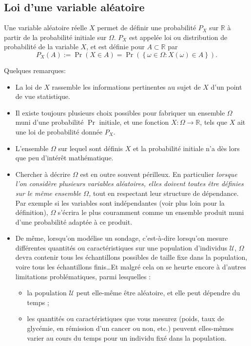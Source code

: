 \documentclass[12pt, a4paper]{book}
\numberwithin{equation}{section}
\newcommand{\R}{{\mathbb R}}
\begin{document}
\subsection{Loi d'une variable aléatoire}

Une variable aléatoire réelle $X$ permet de définir une probabilité $P_X$ sur $\R$ à partir de la probabilité initiale sur $\Omega$. $P_X$ est appelée loi ou distribution de probabilité de la variable $X$, et est définie pour $A\subset \R$ par
\[ P_X(A) := \Pr(X\in A) = \Pr\left(\left\{\omega\in\Omega: X(\omega)\in A\right\}\right). \]

Quelques remarques:
\begin{itemize}
  \item La loi de $X$ rassemble les informations pertinentes au sujet de $X$ d'un point de vue statistique.
	\item Il existe toujours plusieurs choix possibles pour fabriquer un ensemble $\Omega$ muni d'une probabilité $\Pr$ initiale, et une fonction $X: \Omega \rightarrow \R$, tels que $X$ ait une loi de probabilité donnée $P_X$.
	\item L'ensemble $\Omega$ sur lequel sont définis $X$ et la probabilité initiale n'a dès lors que peu d'intérêt mathématique.
	\item Chercher à décrire $\Omega$ est en outre souvent périlleux. En particulier \emph{lorsque l'on considère plusieurs variables aléatoires, elles doivent toutes être définies sur le même ensemble $\Omega$,} tout en respectant leur structure de dépendance. Par exemple si les variables sont indépendantes (voir plus loin pour la définition), $\Omega$ s'écrira le plus couramment comme un ensemble produit muni d'une probabilité adaptée à ce produit.
	\item De même, lorsqu'on modélise un sondage, c'est-à-dire lorsqu'on mesure différentes quantités ou caractéristiques sur une population d'individus $\mathcal{U}$, $\Omega$ devra contenir tous les échantillons possibles de taille fixe dans la population, voire tous les échantillons finis\dots Et malgré cela on se heurte encore à d'autres limitations problématiques, parmi lesquelles :
  \begin{itemize}
    \item la population $\mathcal{U}$ peut elle-même être aléatoire, et elle peut dépendre du temps ;
    \item les quantités ou caractéristiques que vous mesurez (poids, taux de glycémie, en rémission d'un cancer ou non, etc.) peuvent elles-mêmes varier au cours du temps pour un individu fixé dans la population.
  \end{itemize}
\end{itemize}
\end{document}
